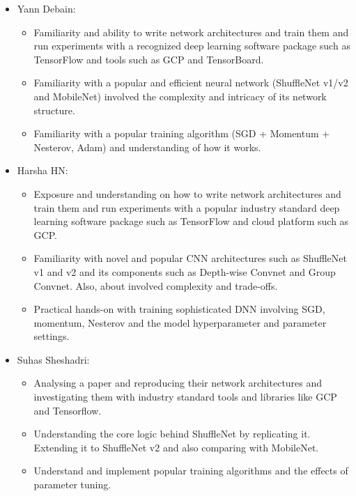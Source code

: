 \documentclass{article}
\begin{document}
\begin{itemize} 

\item Yann Debain:
\begin{itemize} 
\item Familiarity and ability to write network architectures and train them and run experiments with a recognized deep learning software package such as TensorFlow and tools such as GCP and TensorBoard.
\item Familiarity with a popular and efficient neural network (ShuffleNet v1/v2 and MobileNet) involved the complexity and intricacy of its network structure.
\item Familiarity with a popular training algorithm (SGD + Momentum + Nesterov, Adam) and understanding of how it works.
\end{itemize} 

\item Harsha HN:
\begin{itemize} 
\item Exposure and understanding on how to write network architectures and train them and run experiments with a popular industry standard deep learning software package such as TensorFlow and cloud platform such as GCP.

\item Familiarity with novel and popular CNN architectures such as ShuffleNet v1 and v2 and its components such as Depth-wise Convnet and Group Convnet. Also, about involved complexity and trade-offs.

\item Practical hands-on with training sophisticated DNN involving SGD, momentum, Nesterov and the model hyperparameter and parameter settings.
\end{itemize} 

\item Suhas Sheshadri:
\begin{itemize} 
\item Analysing a paper and reproducing their network architectures and investigating them with industry standard tools and libraries like GCP and Tensorflow.
\item Understanding the core logic behind ShuffleNet by replicating it. Extending it to ShuffleNet v2 and also comparing with MobileNet. 
\item Understand and implement popular training algorithms and the effects of parameter tuning.

\end{itemize} 
\end{itemize} 

\newpage

\end{document}
